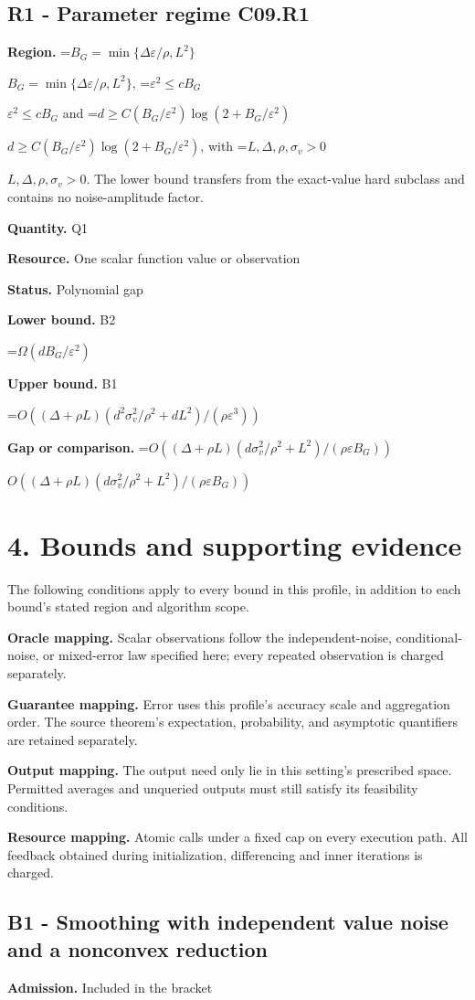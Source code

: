 \documentclass[10pt,a4paper]{article}
\newcommand{\AtlasMath}[1]{\par\begingroup\centering\setbox0=\hbox{$\displaystyle #1$}\ifdim\wd0>1.4\linewidth\typeout{ATLAS WIDE FORMULA: \the\wd0}\fi\ifdim\wd0>\linewidth\resizebox{\linewidth}{!}{\box0}\else\box0\fi\par\endgroup}
\newcommand{\AtlasInlineMath}[1]{\begingroup\setbox0=\hbox{$#1$}\ifdim\wd0>.4\linewidth\endgroup\AtlasMath{#1}\else\endgroup$#1$\fi}
\begin{document}
\subsection{R1 - Parameter regime C09.R1}
\textbf{Region.} \AtlasInlineMath{B_G=\min\{\Delta\varepsilon/\rho,L^2\}}, \AtlasInlineMath{\varepsilon^2\le cB_G} and \AtlasInlineMath{d\ge C(B_G/\varepsilon^2)\log(2+B_G/\varepsilon^2)}, with \AtlasInlineMath{L,\Delta,\rho,\sigma_v>0}. The lower bound transfers from the exact-value hard subclass and contains no noise-amplitude factor.

\textbf{Quantity.} Q1

\textbf{Resource.} One scalar function value or observation

\textbf{Status.} Polynomial gap

\textbf{Lower bound.} B2

\AtlasMath{\Omega(dB_G/\varepsilon^2)}
\textbf{Upper bound.} B1

\AtlasMath{O((\Delta+\rho L)(d^2\sigma_v^2/\rho^2+dL^2)/(\rho\varepsilon^3))}
\textbf{Gap or comparison.} \AtlasInlineMath{O((\Delta+\rho L)(d\sigma_v^2/\rho^2+L^2)/(\rho\varepsilon B_G))}

\section{4. Bounds and supporting evidence}
The following conditions apply to every bound in this profile, in addition to each bound's stated region and algorithm scope.

\textbf{Oracle mapping.} Scalar observations follow the independent-noise, conditional-noise, or mixed-error law specified here; every repeated observation is charged separately.

\textbf{Guarantee mapping.} Error uses this profile's accuracy scale and aggregation order. The source theorem's expectation, probability, and asymptotic quantifiers are retained separately.

\textbf{Output mapping.} The output need only lie in this setting's prescribed space. Permitted averages and unqueried outputs must still satisfy its feasibility conditions.

\textbf{Resource mapping.} Atomic calls under a fixed cap on every execution path. All feedback obtained during initialization, differencing and inner iterations is charged.

\subsection{B1 - Smoothing with independent value noise and a nonconvex reduction}
\textbf{Admission.} Included in the bracket
\end{document}
